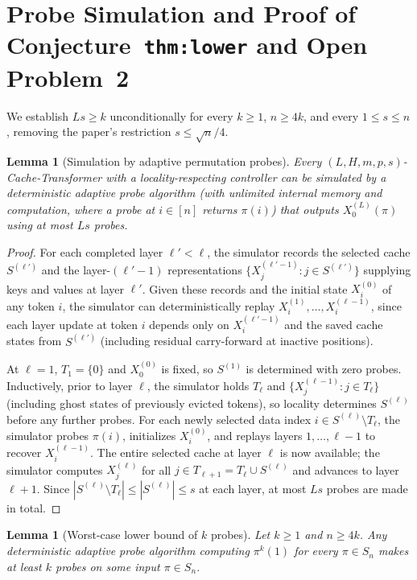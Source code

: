 \documentclass[11pt]{article}
\theoremstyle{plain}
\newtheorem{lemma}[theorem]{Lemma}
\theoremstyle{definition}
\theoremstyle{remark}
\begin{document}
\section{Probe Simulation and Proof of Conjecture~\texttt{thm:lower} and Open Problem~2}

We establish $Ls \ge k$ unconditionally for every $k \ge 1$, $n \ge 4k$, and every $1 \le s \le n$, removing the paper's restriction $s \le \sqrt{n}/4$.

\begin{lemma}[Simulation by adaptive permutation probes]\label{lem:sim}
Every $(L, H, m, p, s)$-Cache-Transformer with a locality-respecting controller can be simulated by a deterministic adaptive probe algorithm (with unlimited internal memory and computation, where a probe at $i \in [n]$ returns $\pi(i)$) that outputs $X^{(L)}_0(\pi)$ using at most $Ls$ probes.
\end{lemma}

\begin{proof}
For each completed layer $\ell' < \ell$, the simulator records the selected cache $S^{(\ell')}$ and the layer-$(\ell'-1)$ representations $\{X^{(\ell'-1)}_j : j \in S^{(\ell')}\}$ supplying keys and values at layer $\ell'$.
Given these records and the initial state $X^{(0)}_i$ of any token $i$, the simulator can deterministically replay $X^{(1)}_i, \dots, X^{(\ell-1)}_i$, since each layer update at token $i$ depends only on $X^{(\ell'-1)}_i$ and the saved cache states from $S^{(\ell')}$ (including residual carry-forward at inactive positions).

At $\ell = 1$, $T_1 = \{0\}$ and $X^{(0)}_0$ is fixed, so $S^{(1)}$ is determined with zero probes.
Inductively, prior to layer $\ell$, the simulator holds $T_\ell$ and $\{X^{(\ell-1)}_j : j \in T_\ell\}$ (including ghost states of previously evicted tokens), so locality determines $S^{(\ell)}$ before any further probes.
For each newly selected data index $i \in S^{(\ell)} \setminus T_\ell$, the simulator probes $\pi(i)$, initializes $X^{(0)}_i$, and replays layers $1, \dots, \ell - 1$ to recover $X^{(\ell-1)}_i$.
The entire selected cache at layer $\ell$ is now available; the simulator computes $X^{(\ell)}_j$ for all $j \in T_{\ell+1} = T_\ell \cup S^{(\ell)}$ and advances to layer $\ell + 1$.
Since $|S^{(\ell)} \setminus T_\ell| \le |S^{(\ell)}| \le s$ at each layer, at most $Ls$ probes are made in total.
\end{proof}

\begin{lemma}[Worst-case lower bound of $k$ probes]\label{lem:adv}
Let $k \ge 1$ and $n \ge 4k$. Any deterministic adaptive probe algorithm computing $\pi^k(1)$ for every $\pi \in S_n$ makes at least $k$ probes on some input $\pi \in S_n$.
\end{lemma}
\end{document}
